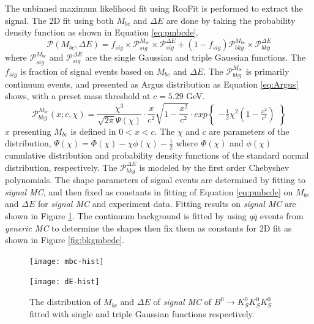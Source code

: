 The unbinned maximum likelihood fit using RooFit is performed to extract the signal. The 2D fit using both $M_{bc}$ and $\Delta{E}$ are done by taking the probability density function as shown in Equation \ref{eq:pmbcde}.
\begin{equation}\label{eq:pmbcde}
\mathcal{P}(M_{bc},\Delta{E}) = 
f_{sig}\times \mathcal{P}_{sig}^{M_{bc}}\times\mathcal{P}_{sig}^{\Delta{E}}
+ 
(1-f_{sig})\mathcal{P}_{bkg}^{M_{bc}}\times\mathcal{P}_{bkg}^{\Delta{E}}
\end{equation}
where $\mathcal{P}_{sig}^{M_{bc}}$ and $\mathcal{P}_{sig}^{\Delta{E}}$ are the single Gaussian and triple Gaussian functions. The $f_{sig}$ is fraction of signal events based on $M_{bc}$ and $\Delta E$. The $\mathcal{P}_{bkg}^{M_{bc}}$ is  primarily continuum events, and presented as Argus distribution as Equation \ref{eq:Argus} shows, with a preset mass threshold at $c = 5.29$ GeV. 
\begin{equation}\label{eq:Argus}
\mathcal{P}_{bkg}^{M_{bc}}(x;c,\chi)=\frac{\chi^3}{\sqrt{2\pi}\Psi(\chi)}\cdot
\frac{x}{c^2}\sqrt{1-\frac{x^2}{c^2}}\cdot
exp\begin{Bmatrix}
-\frac{1}{2}\chi^2(1-\frac{x^2}{c^2})
\end{Bmatrix}
\end{equation}
 $x$ presenting $M_{bc}$ is defined in $0<x<c$. The $\chi$ and $c$ are parameters of the distribution, $\Psi(\chi)=\Phi(\chi)-\chi\phi(\chi)-\frac{1}{2}$ where $\Phi(\chi)$ and $\phi(\chi)$  cumulative distribution and probability density functions of the standard normal distribution, respectively. 
 The $\mathcal{P}_{bkg}^{\Delta{E}}$ is modeled by the first order Chebyshev polynomials. The shape parameters of signal events are determined by fitting to \textit{signal MC}, and  then fixed as constants in fitting of Equation \ref{eq:pmbcde} on $M_{bc}$ and $\Delta E$ for \textit{signal MC} and experiment data. Fitting results on \textit{signal MC} are shown in Figure \ref{fig:mbcde1D}. The continuum background is fitted by using $q\bar{q}$ events from \textit{generic MC} to determine the shapes then fix them as constants for 2D fit as shown in Figure \ref{fig:bkgmbcde}.
 \begin{figure}[htbp]
 	\begin{minipage}[b]{0.5\linewidth}
 		\centering 
 		\texttt{[image: mbc-hist]}
 	\end{minipage}
 	\begin{minipage}[b]{0.5\linewidth}
 		\centering 
 		\texttt{[image: dE-hist]}
 	\end{minipage}
 	\caption{The distribution of $M_{bc}$ and $\Delta E$ of \textit{signal MC} of $B^0 \to K_S^0  K_S^0  K_S^0$ fitted with single and triple Gaussian functions respectively.}
 	\label{fig:mbcde1D}
 \end{figure}
